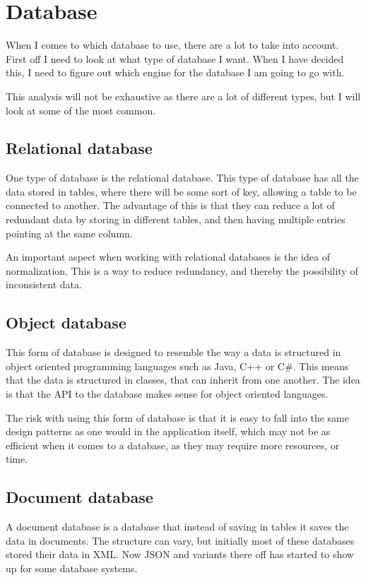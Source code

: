 \section{Database }
\label{sec:Database_engine}
When I comes to which database to use, there are a lot to take into account.
First off I need to look at what type of database I want. When I have decided
this, I need to figure out which engine for the database I am going to go with.

This analysis will not be exhaustive as there are a lot of different types, but I will look at some of the most common.

\subsection{Relational database}
\label{sub:Relational database}
One type of database is the relational database. This type of database has all the data stored in tables, where there will be some sort of key, allowing a table to be connected to another. The advantage of this is that they can reduce a lot of redundant data by storing in different tables, and then having multiple entries pointing at the same column\cite{ibm:choosing_dbms}.

An important aspect when working with relational databases is the idea of normalization. This is a way to reduce redundancy, and thereby the possibility of inconsistent data.

\subsection{Object database}
\label{sub:Object database}
This form of database is designed to resemble the way a data is structured in object oriented programming languages such as Java, C++ or C\#. This means that the data is structured in classes, that can inherit from one another. The idea is that the API to the database makes sense for object oriented languages.

The risk with using this form of database is that it is easy to fall into the same design patterns as one would in the application itself, which may not be as efficient when it comes to a database, as they may require more resources, or time\cite{ibm:choosing_dbms}.

\subsection{Document database}
\label{sub:Document database}
A document database is a database that instead of saving in tables it saves the data in documents. The structure can vary, but initially most of these databases stored their data in XML\cite{ibm:choosing_dbms}. Now JSON and variants there off has started to show up for some database systems.

